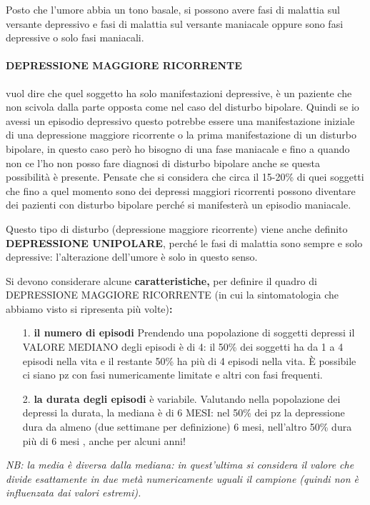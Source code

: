 Posto
che l'umore abbia un tono basale, si possono avere fasi di malattia sul
versante depressivo e fasi di malattia sul versante maniacale oppure
sono fasi depressive o solo fasi maniacali.

\paragraph{DEPRESSIONE MAGGIORE RICORRENTE} vuol dire che quel soggetto ha
solo manifestazioni depressive, è un paziente che non scivola dalla
parte opposta come nel caso del disturbo bipolare. Quindi se io avessi
un episodio depressivo questo potrebbe essere una manifestazione
iniziale di una depressione maggiore ricorrente o la prima
manifestazione di un disturbo bipolare, in questo caso però ho bisogno
di una fase maniacale e fino a quando non ce l'ho non posso fare
diagnosi di disturbo bipolare anche se questa possibilità è presente.
Pensate che si considera che circa il 15-20\% di quei soggetti che fino
a quel momento sono dei depressi maggiori ricorrenti possono diventare
dei pazienti con disturbo bipolare perché si manifesterà un episodio
maniacale.

Questo tipo di disturbo (depressione maggiore ricorrente) viene anche
definito \textbf{DEPRESSIONE UNIPOLARE}, perché le fasi di malattia sono
sempre e solo depressive: l'alterazione dell'umore è solo in questo
senso.

Si devono considerare alcune \textbf{caratteristiche,} per definire il
quadro di DEPRESSIONE MAGGIORE RICORRENTE (in cui la sintomatologia che
abbiamo visto si ripresenta più volte)\textbf{:}

\begin{itemize}
\item[1.]
  \textbf{il numero di episodi} Prendendo una popolazione di soggetti
  depressi il VALORE MEDIANO degli episodi è di 4: il 50\% dei soggetti
  ha da 1 a 4 episodi nella vita e il restante 50\% ha più di 4 episodi
  nella vita. È possibile ci siano pz con fasi numericamente limitate e
  altri con fasi frequenti.
\item[2.]
  \textbf{la durata degli episodi} è variabile. Valutando nella
  popolazione dei depressi la durata, la mediana è di 6 MESI: nel 50\%
  dei pz la depressione dura da almeno (due settimane per definizione) 6
  mesi, nell'altro 50\% dura più di 6 mesi , anche per alcuni anni!
\end{itemize}

\emph{NB: la media è diversa dalla mediana: in quest'ultima si considera
il valore che divide esattamente in due metà numericamente uguali il
campione (quindi non è influenzata dai valori estremi).}

